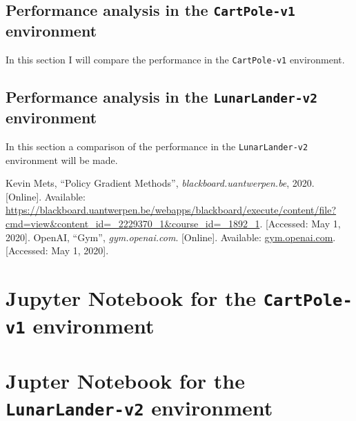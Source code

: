 \documentclass{article}
\begin{document}
  \subsection[The \texttt{CartPole-v1} environment]{Performance analysis in the
    \texttt{CartPole-v1} environment}
   In this section I will compare the performance in the \texttt{CartPole-v1} 
   environment.

  \subsection[The \texttt{LunarLander-v2} environment]{Performance analysis in 
    the \texttt{LunarLander-v2} environment}
   In this section a comparison of the performance in the \texttt{LunarLander-v2} environment will be made.




 \begin{thebibliography}{9}
   Kevin Mets, ``Policy Gradient Methods'', \textit{blackboard.uantwerpen.be}, 2020. [Online]. Available: \url{https://blackboard.uantwerpen.be/webapps/blackboard/execute/content/file?cmd=view&content_id=_2229370_1&course_id=_1892_1}. [Accessed: May 1, 2020].
   OpenAI, ``Gym'', \textit{gym.openai.com}. [Online]. Available: \url{gym.openai.com}. [Accessed: May 1, 2020].
 \end{thebibliography}


 \appendix

 \section{Jupyter Notebook for the \texttt{CartPole-v1} environment}
 \label{sec:cartpole-notebook}
 

 \section{Jupter Notebook for the \texttt{LunarLander-v2} environment}
 \label{sec:lunar-notebook}
 
\end{document}
